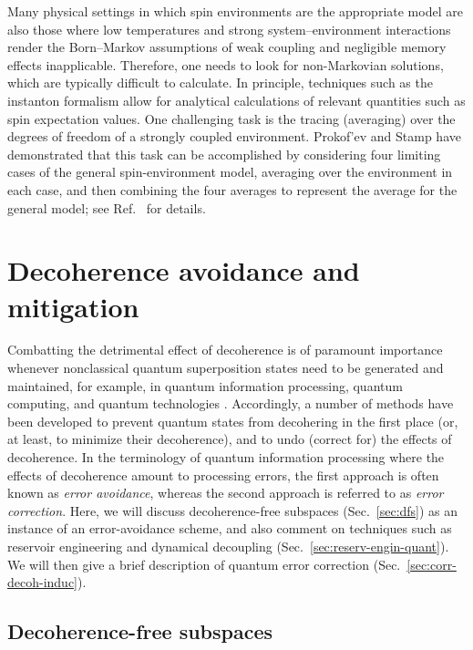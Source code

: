 \documentclass[3p,sort&compress,12pt]{elsarticle}
\begin{document}
Many physical settings in which spin environments are the appropriate model are also those where low temperatures and strong system--environment interactions render the Born--Markov assumptions of weak coupling and negligible memory effects inapplicable. Therefore, one needs to look for non-Markovian solutions, which are typically difficult to calculate. In principle, techniques such as the instanton formalism \cite{Prokofev:2000:zz} allow for analytical calculations of relevant quantities such as spin expectation values. One challenging task is the tracing (averaging) over the degrees of freedom of a strongly coupled environment. Prokof'ev and Stamp \cite{Prokofev:2000:zz} have demonstrated that this task can be accomplished by considering four limiting cases of the general spin-environment model, averaging over the environment in each case, and then combining the four averages to represent the average for the general model; see Ref.~\cite{Prokofev:2000:zz} for details.

\section{\label{sec:decoh-errcorr}Decoherence avoidance and mitigation}

Combatting the detrimental effect of decoherence is of paramount importance whenever nonclassical quantum superposition states need to be generated and maintained, for example, in quantum information processing, quantum computing, and quantum technologies \cite{Dowling:2003:tv}. Accordingly, a number of methods have been developed to prevent quantum states from decohering in the first place (or, at least, to minimize their decoherence), and to undo (correct for) the effects of decoherence. In the terminology of quantum information processing where the effects of decoherence amount to processing errors, the first approach is often known as \emph{error avoidance}, whereas the second approach is referred to as \emph{error correction}. Here, we will discuss decoherence-free subspaces  (Sec.~\ref{sec:dfs}) as an instance of an error-avoidance scheme, and also comment on techniques such as reservoir engineering and dynamical decoupling (Sec.~\ref{sec:reserv-engin-quant}). We will then give a brief description of quantum error correction (Sec.~\ref{sec:corr-decoh-induc}).

\subsection{\label{sec:dfs}Decoherence-free subspaces}
\end{document}
